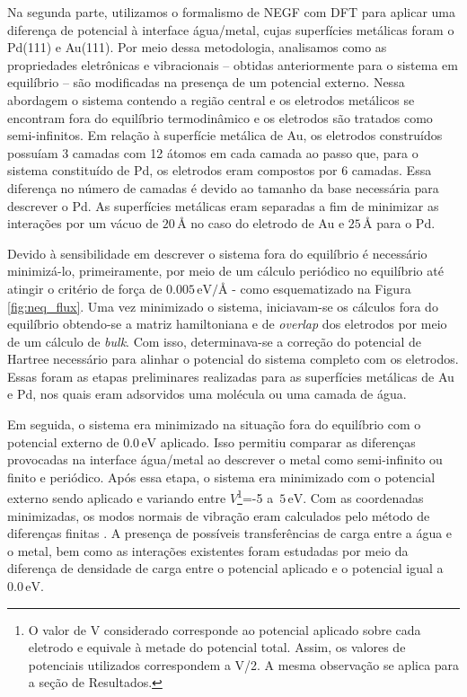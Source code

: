 Na segunda parte, utilizamos o formalismo de NEGF com DFT para aplicar uma diferença de potencial à interface água/metal, cujas superfícies metálicas foram o Pd(111) e Au(111). Por meio dessa metodologia, analisamos como as propriedades eletrônicas e vibracionais -- obtidas anteriormente para o sistema em equilíbrio -- são modificadas na presença de um potencial externo. Nessa abordagem o sistema contendo a região central e os eletrodos metálicos se encontram fora do equilíbrio termodinâmico e os eletrodos são tratados como semi-infinitos. Em relação à superfície metálica de Au, os eletrodos construídos possuíam 3 camadas com 12 átomos em cada camada ao passo que, para o sistema constituído de Pd, os eletrodos eram compostos por 6 camadas. Essa diferença no número de camadas é devido ao tamanho da base necessária para descrever o Pd. As superfícies metálicas eram separadas a fim de minimizar as interações por um vácuo de $20\,\si{\angstrom}$ no caso do eletrodo de Au e $25\,\si{\angstrom}$ para o Pd. 

Devido à sensibilidade em descrever o sistema fora do equilíbrio é necessário minimizá-lo, primeiramente, por meio de um cálculo periódico no equilíbrio até atingir o critério de força de $0.005\,\si{\eV}/\si{\angstrom}$ - como esquematizado na Figura \ref{fig:neq_flux}. Uma vez minimizado o sistema, iniciavam-se os cálculos fora do equilíbrio obtendo-se a matriz hamiltoniana e de \textit{overlap} dos eletrodos por meio de um cálculo de \textit{bulk}. Com isso, determinava-se a correção do potencial de Hartree necessário para alinhar o potencial do sistema completo com os eletrodos. Essas foram as etapas preliminares realizadas para as superfícies metálicas de Au e Pd, nos quais eram adsorvidos uma molécula ou uma camada de água. 

Em seguida, o sistema era minimizado na situação fora do equilíbrio com o potencial externo de $ 0.0\,\si{\eV} $ aplicado. Isso permitiu comparar as diferenças provocadas na interface água/metal ao descrever o metal como semi-infinito ou finito e periódico. Após essa etapa, o sistema era minimizado com o potencial externo sendo aplicado e variando entre $ V $\footnote[7]{O valor de V considerado corresponde ao potencial aplicado sobre cada eletrodo e equivale à metade do potencial total. Assim, os valores de potenciais utilizados correspondem a V/2. A mesma observação se aplica para a seção de Resultados.}=-5 a $\,5\,\si{\eV} $. Com as coordenadas minimizadas, os modos normais de vibração eram calculados pelo método de diferenças finitas \cite{phonons}. A presença de possíveis transferências de carga entre a água e o metal, bem como as interações existentes foram estudadas por meio da diferença de densidade de carga entre o potencial aplicado e o potencial igual a $ 0.0\,\si{\eV} $.

